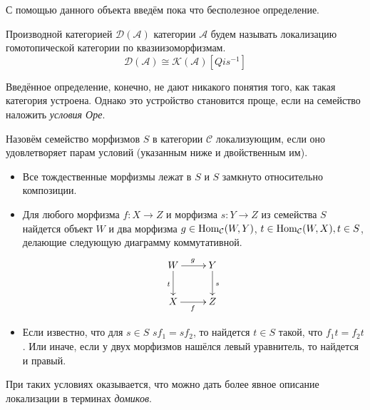 \documentclass[../main.tex]{subfiles}
\begin{document}
  С помощью данного объекта введём пока что бесполезное определение.
  \begin{to_def}\label{DerCat}
    Производной категорией $\mathcal{D}(\mathcal{A})$ категории $\mathcal{A}$ будем называть локализацию гомотопической категории по квазиизоморфизмам.
    \begin{equation*}
      \mathcal{D}(\mathcal{A}) \cong \mathcal{K}(\mathcal{A})[Qis^{-1}]
    \end{equation*}
\end{to_def}

Введённое определение, конечно, не дают никакого понятия того, как такая категория устроена. 
Однако это устройство становится проще, если на семейство наложить \emph{условия Оре}.

\begin{to_def}
    Назовём семейство морфизмов $S$ в категории $\mathcal{C}$ локализующим, если оно удовлетворяет парам условий (указанным ниже и двойственным им).
    \begin{itemize}
      \item Все тождественные морфизмы лежат в $S$ и $S$ замкнуто относительно композиции.
      \item Для любого морфизма $f:X\to Z$ и морфизма $s:Y\to Z$ из семейства $S$ найдется объект $W$ и два морфизма $g\in \operatorname{Hom}_\mathcal{C}(W, Y)$, $t\in \operatorname{Hom}_\mathcal{C}(W, X), t\in S$, делающие следующую диаграмму коммутативной.
	\begin{equation}\label{ore_2_cond}
	  \xymatrix{W \ar[r]^g \ar[d]_t & Y\ar[d]^s\\
	  X \ar[r]_f & Z}
	\end{equation}
      \item Если известно, что для $s\in S$ $sf_1=sf_2$, то найдется $t\in S$ такой, что $f_1t=f_2t$. 
	Или иначе, если у двух морфизмов нашёлся левый уравнитель, то найдется и правый.
    \end{itemize}
      \label{ore_conditions}
    \end{to_def}

    При таких условиях оказывается, что можно дать более явное описание локализации в терминах \emph{домиков}.
\end{document}
